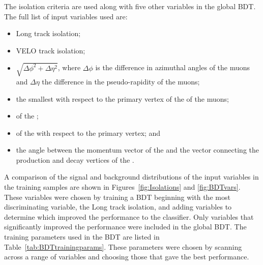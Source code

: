 The isolation criteria are used along with five other variables in the global BDT. The full list of input variables used are:
\begin{itemize}
\item Long track isolation;
\item VELO track isolation;
\item $\sqrt{\Delta \phi^{2} + \Delta \eta^{2}}$, where $\Delta \phi$ is the difference in azimuthal angles of the muons and $\Delta \eta$ the difference in the pseudo-rapidity of the muons;
\item the smallest \chiIP with respect to the primary vertex of the \bsmumu of the muons;
\item \chivtx of the \bs;
\item \chiIP of the \bs with respect to the primary vertex; and
\item the angle between the momentum vector of the \bs and the vector connecting the production and decay vertices of the \bs.
\end{itemize}

A comparison of the signal and background distributions of the input variables in the training samples are shown in Figures~\ref{fig:Isolations} and \ref{fig:BDTvars}. These variables were chosen by training a BDT beginning with the most discriminating variable, the Long track isolation, and adding variables to determine which improved the performance to the classifier. Only variables that significantly improved the performance were included in the global BDT. The training parameters used in the BDT are listed in Table~\ref{tab:BDTtrainingparams}. These parameters were chosen by scanning across a range of variables and choosing those that gave the best performance. 

